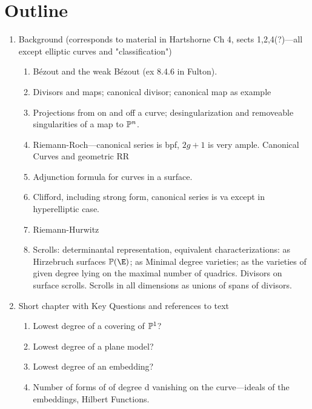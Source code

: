 \documentclass[12pt, leqno]{article}
\begin{document}
\section*{Outline}
 \begin{enumerate}

\item Background (corresponds to material in Hartshorne Ch 4, sects 1,2,4(?)---all except elliptic curves and "classification")
\begin{enumerate}
\item B\'ezout and the  weak B\'ezout (ex 8.4.6 in Fulton).
\item Divisors and maps; canonical divisor; canonical map as example
\item Projections from on and off a curve; desingularization and removeable singularities of a map to ${\mathbb P}^n$.
\item Riemann-Roch---canonical series is bpf, $2g+1$ is very ample. Canonical Curves and geometric RR
\item Adjunction formula for curves in a surface.
\item Clifford, including strong form, canonical series is va except in hyperelliptic case.
\item Riemann-Hurwitz
\item Scrolls: determinantal representation, equivalent characterizations: as Hirzebruch surfaces $\PP(\E)$; as Minimal degree varieties; as the varieties of given degree lying on the maximal number of quadrics. Divisors on surface scrolls. Scrolls in all dimensions as unions of spans of divisors. 

\end{enumerate}

\item Short chapter with Key Questions and references to text
\begin{enumerate}
 \item Lowest degree of a covering of ${\mathbb P}^1$?
 \item Lowest degree of a plane model?
 \item Lowest degree of an embedding?
 \item Number of forms of of degree d vanishing on the curve---ideals of the embeddings, Hilbert Functions.
\end{enumerate}


\end{enumerate}
\end{document}
